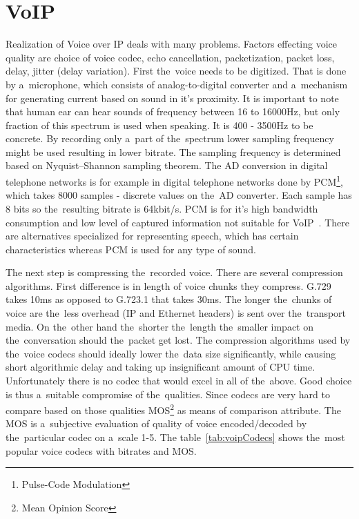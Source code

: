 \section{VoIP}
Realization of Voice over IP deals with many problems. Factors effecting voice quality are choice of voice codec, echo cancellation, packetization, packet loss, delay, jitter (delay variation). First the~voice needs to be digitized. That is done by a~microphone, which consists of analog-to-digital converter and a~mechanism for generating current based on sound in it's proximity. It is important to note that human ear can hear sounds of frequency between 16 to 16000Hz, but only fraction of this spectrum is used when speaking. It is 400 - 3500Hz to be concrete. By recording only a~part of the~spectrum lower sampling frequency might be used resulting in lower bitrate. The sampling frequency is determined based on Nyquist–Shannon sampling theorem. The AD conversion in digital telephone networks is for example in digital telephone networks done by PCM\footnote{Pulse-Code Modulation}, which takes 8000 samples - discrete values on the~AD converter. Each sample has 8 bits so the~resulting bitrate is 64kbit/s. PCM is for it's high bandwidth consumption and low level of captured information not suitable for VoIP~\cite{digitalSpeechBook}. There are alternatives specialized for representing speech, which has certain characteristics whereas PCM is used for any type of sound.  
 
The next step is compressing the~recorded voice. There are several compression algorithms. First difference is in length of voice chunks they compress. G.729 takes 10ms as opposed to G.723.1 that takes 30ms. The longer the~chunks of voice are the~less overhead (IP and Ethernet headers) is sent over the~transport media. On the~other hand the~shorter the~length the~smaller impact on the~conversation should the~packet get lost. The compression algorithms used by the~voice codecs should ideally lower the~data size significantly, while causing short algorithmic delay and taking up insignificant amount of CPU time. Unfortunately there is no codec that would excel in all of the~above. Good choice is thus a~suitable compromise of the~qualities. Since codecs are very hard to compare based on those qualities MOS\footnote{Mean Opinion Score} as means of comparison attribute. The MOS is a~subjective evaluation of quality of voice encoded/decoded by the~particular codec on a~scale 1-5. The table~\ref{tab:voipCodecs} shows the~most popular voice codecs with bitrates and MOS. 


